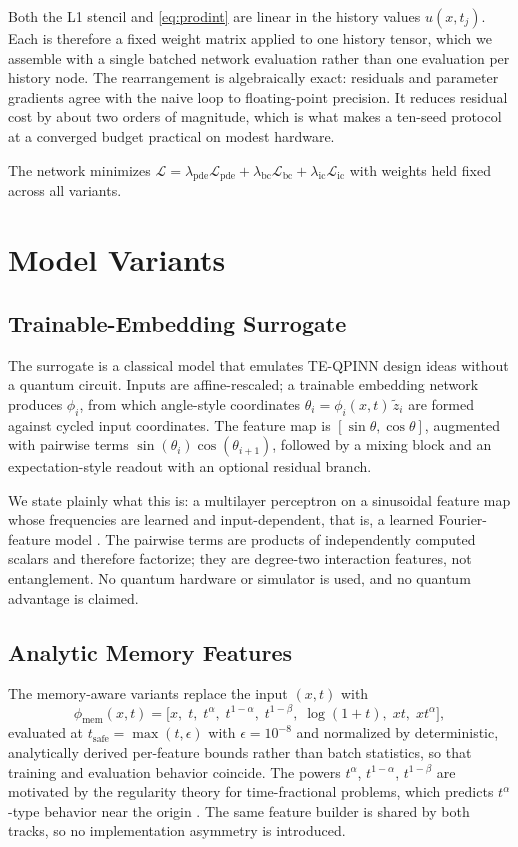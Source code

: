 \documentclass[journal]{IEEEtran}
\begin{document}
Both the L1 stencil and \eqref{eq:prodint} are linear in the history values
$u(x,t_j)$. Each is therefore a fixed weight matrix applied to one history tensor,
which we assemble with a single batched network evaluation rather than one
evaluation per history node. The rearrangement is algebraically exact: residuals
and parameter gradients agree with the naive loop to floating-point precision. It
reduces residual cost by about two orders of magnitude, which is what makes a
ten-seed protocol at a converged budget practical on modest hardware.

The network minimizes
$\mathcal{L}=\lambda_{\mathrm{pde}}\mathcal{L}_{\mathrm{pde}}+
\lambda_{\mathrm{bc}}\mathcal{L}_{\mathrm{bc}}+
\lambda_{\mathrm{ic}}\mathcal{L}_{\mathrm{ic}}$ with weights held fixed across all
variants.

\section{Model Variants}

\subsection{Trainable-Embedding Surrogate}
The surrogate is a classical model that emulates TE-QPINN design ideas
\cite{TEQPINN} without a quantum circuit. Inputs are affine-rescaled; a trainable
embedding network produces $\phi_i$, from which angle-style coordinates
$\theta_i=\phi_i(x,t)\,\tilde z_i$ are formed against cycled input coordinates. The
feature map is $[\sin\theta,\cos\theta]$, augmented with pairwise terms
$\sin(\theta_i)\cos(\theta_{i+1})$, followed by a mixing block and an
expectation-style readout with an optional residual branch.

We state plainly what this is: a multilayer perceptron on a sinusoidal feature map
whose frequencies are learned and input-dependent, that is, a learned
Fourier-feature model \cite{FourierFeatures}. The pairwise terms are products of
independently computed scalars and therefore factorize; they are degree-two
interaction features, not entanglement. No quantum hardware or simulator is used,
and no quantum advantage is claimed.

\subsection{Analytic Memory Features}
The memory-aware variants replace the input $(x,t)$ with
\begin{equation}
\phi_{\mathrm{mem}}(x,t)=\bigl[x,\;t,\;t^{\alpha},\;t^{1-\alpha},\;t^{1-\beta},\;
\log(1+t),\;xt,\;xt^{\alpha}\bigr],
\end{equation}
evaluated at $t_{\mathrm{safe}}=\max(t,\epsilon)$ with $\epsilon=10^{-8}$ and
normalized by deterministic, analytically derived per-feature bounds rather than
batch statistics, so that training and evaluation behavior coincide. The powers
$t^{\alpha}$, $t^{1-\alpha}$, $t^{1-\beta}$ are motivated by the regularity theory
for time-fractional problems, which predicts $t^{\alpha}$-type behavior near the
origin \cite{GradedMesh}. The same feature builder is shared by both tracks, so no
implementation asymmetry is introduced.
\end{document}
